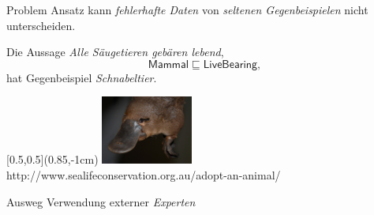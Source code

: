 \documentclass[ngerman]{beamer}
\begin{document}


\begin{frame}

  \onslide<+->

  \begin{block}{Problem}
    Ansatz kann \emph{fehlerhafte Daten} von \emph{seltenen Gegenbeispielen} nicht
    unterscheiden.
  \end{block}

  \onslide<+->

  \begin{Beispiel}
    Die Aussage \emph{Alle Säugetieren gebären lebend},
    \begin{equation*}
      \mathsf{Mammal} \sqsubseteq \mathsf{LiveBearing},
    \end{equation*}
    \onslide<+->
    hat Gegenbeispiel \emph{Schnabeltier}.
  
    \begin{textblock*}{\linewidth}[0.5,0.5](0.85\linewidth,-1cm)
      \centering
      \includegraphics[width=3cm]{platypus}\\[-2ex]
      {\fontsize{3pt}{4pt}\selectfont http://www.sealifeconservation.org.au/adopt-an-animal/}
    \end{textblock*}

  \end{Beispiel}

  \onslide<+->

  \begin{block}{Ausweg}
    Verwendung externer \emph{Experten}
  \end{block}

\end{frame}
\end{document}
